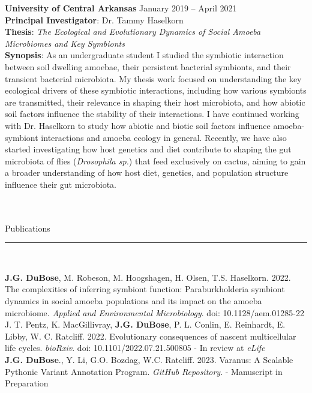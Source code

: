 \documentclass{article}
\begin{document}
\noindent \textbf{University of Central Arkansas} \hfill January 2019 – April 2021\\
\textbf{Principal Investigator}: Dr. Tammy Haselkorn\\
\textbf{Thesis}: \emph{The Ecological and Evolutionary Dynamics of Social Amoeba Microbiomes and Key Symbionts} \\
\textbf{Synopsis}: As an undergraduate student I studied the symbiotic interaction between soil dwelling amoebae, their persistent bacterial symbionts, 
and their transient bacterial microbiota. My thesis work focused on understanding the key ecological drivers of these symbiotic interactions, 
including how various symbionts are transmitted, their relevance in shaping their host microbiota, and how abiotic soil factors influence the stability of their interactions. 
I have continued working with Dr. Haselkorn to study how abiotic and biotic soil factors influence amoeba-symbiont interactions and amoeba ecology in general. 
Recently, we have also started investigating how host genetics and diet contribute to shaping the gut microbiota of flies (\emph{Drosophila sp.}) 
that feed exclusively on cactus, aiming to gain a broader understanding of how host diet, genetics, and population structure influence their gut microbiota.\\
\\ \\
\begin{flushleft}
{\Large Publications} \rule{16.51cm}{0.4pt}\\
\end{flushleft}
\hangindent=0.7cm \textbf{J.G. DuBose}, M. Robeson, M. Hoogshagen, H. Olsen, T.S. Haselkorn. 2022. The complexities of inferring symbiont function: Paraburkholderia symbiont dynamics in social amoeba populations and its impact on the amoeba microbiome. \emph{Applied and Environmental Microbiology}. doi: 10.1128/aem.01285-22 \\

\hangindent=0.7cm J. T. Pentz, K. MacGillivray, \textbf{J.G. DuBose}, P. L. Conlin, E. Reinhardt, E. Libby, W. C. Ratcliff. 2022. Evolutionary consequences of nascent multicellular life cycles. \emph{bioRxiv}. doi: 10.1101/2022.07.21.500805 - In review at \emph{eLife} \\

\hangindent=0.7cm \textbf{J.G. DuBose}., Y. Li, G.O. Bozdag, W.C. Ratcliff. 2023. Varanus: A Scalable Pythonic Variant Annotation Program. \emph{GitHub Repository}. - Manuscript in Preparation \\
\end{document}
